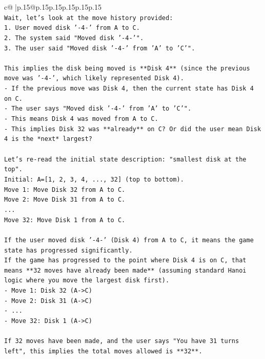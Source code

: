 \documentclass{article}
\begin{document}
{\begin{supertabular}{c@{$\;$}|p{.15\linewidth}@{}p{.15\linewidth}p{.15\linewidth}p{.15\linewidth}p{.15\linewidth}p{.15\linewidth}}
{{{\\ 
\texttt{Wait, let's look at the move history provided:} \\
\texttt{1. User moved disk '{-}4{-}' from A to C.} \\
\texttt{2. The system said "Moved disk '{-}4{-}'".} \\
\texttt{3. The user said "Moved disk '{-}4{-}' from 'A' to 'C'".} \\
\\ 
\texttt{This implies the disk being moved is **Disk 4** (since the previous move was '{-}4{-}', which likely represented Disk 4).} \\
\texttt{{-} If the previous move was Disk 4, then the current state has Disk 4 on C.} \\
\texttt{{-} The user says "Moved disk '{-}4{-}' from 'A' to 'C'".} \\
\texttt{{-} This means Disk 4 was moved from A to C.} \\
\texttt{{-} This implies Disk 32 was **already** on C? Or did the user mean Disk 4 is the *next* largest?} \\
\\ 
\texttt{Let's re{-}read the initial state description: "smallest disk at the top".} \\
\texttt{Initial: A={[}1, 2, 3, 4, ..., 32{]} (top to bottom).} \\
\texttt{Move 1: Move Disk 32 from A to C.} \\
\texttt{Move 2: Move Disk 31 from A to C.} \\
\texttt{...} \\
\texttt{Move 32: Move Disk 1 from A to C.} \\
\\ 
\texttt{If the user moved disk '{-}4{-}' (Disk 4) from A to C, it means the game state has progressed significantly.} \\
\texttt{If the game has progressed to the point where Disk 4 is on C, that means **32 moves have already been made** (assuming standard Hanoi logic where you move the largest disk first).} \\
\texttt{{-} Move 1: Disk 32 (A{-}>C)} \\
\texttt{{-} Move 2: Disk 31 (A{-}>C)} \\
\texttt{{-} ...} \\
\texttt{{-} Move 32: Disk 1 (A{-}>C)} \\
\\ 
\texttt{If 32 moves have been made, and the user says "You have 31 turns left", this implies the total moves allowed is **32**.} \\
}}}
\end{supertabular}}
\end{document}
